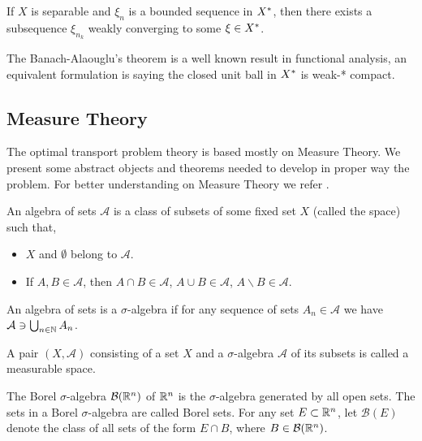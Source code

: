 \begin{theorem}
	If $X$ is separable and $\xi_n$ is a bounded sequence in ${X}^*$, then there exists a subsequence $\xi_{n_k}$ weakly converging to some $\xi \in {X}^*$.
\end{theorem}

The Banach-Alaouglu's theorem is a well known result in functional analysis, an equivalent formulation is saying the closed unit ball in ${X}^*$ is weak-* compact.

\subsection{Measure Theory}

The optimal transport problem theory is based mostly on Measure Theory. We present some abstract objects and theorems needed to develop in proper way the problem. For better understanding on Measure Theory we refer \cite{bogachev2007Measure}. 
\begin{definition}
	An algebra of sets $\mathcal{A}$ is a class of subsets of some fixed set $X$ (called the space) such that,
	\begin{itemize}
		\item $X$ and $\emptyset$ belong to $\mathcal{A}$.
		\item If $A, B \in \mathcal{A}$, then $A\cap B \in \mathcal{A}$, $A\cup B \in \mathcal A$, $A\backslash B \in \mathcal A$.
	\end{itemize}
	An algebra of sets is a $\sigma$-algebra if for any sequence of sets $A_n \in \mathcal A$ we have $\mathcal{A}\ni \bigcup_{n\in \mathbb{N}} A_n $.
\end{definition}

\begin{definition} 
	A pair $(X, \mathcal A)$ consisting of a set $X$ and a $\sigma$-algebra $\mathcal A$ of its subsets is called a measurable space.
\end{definition}

\begin{definition}
	The Borel $\sigma$-algebra $\mathcal{B}(\mathbb{R}^n)$ of $\mathbb{R}^n$ is the $\sigma$-algebra generated by all open sets. The sets in a Borel $\sigma$-algebra are called Borel sets. For any set $E\subset \mathbb{R}^n$, let $\mathcal B(E)$ denote the class of all sets of the form $E\cap B$, where $B\in\mathcal B(\mathbb{R}^n)$.
\end{definition}

